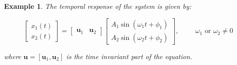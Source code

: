 \documentclass[12pt,letter]{article}
\newtheorem{ex}{Example}
\numberwithin{ex}{section} %
\newenvironment{example}{\begin{mdframed}[middlelinewidth=0.5mm]\begin{ex}\normalfont}{\end{ex}\end{mdframed}}
\numberwithin{re}{section} %
\begin{document}
\begin{example}
\pagebreak


The temporal response of the system is given by:

\begin{equation}
\begin{bmatrix} x_1(t) \\  x_2(t) \end{bmatrix} =  \begin{bmatrix} \mathbf{u}_1 & \mathbf{u}_2 \end{bmatrix}
\begin{bmatrix} A_1 \sin (\omega_1 t + \phi_1 )\\ A_2 \sin (\omega_2 t + \phi_2 )\end{bmatrix}, \hspace{1cm} \omega_1 \text{ or } \omega_2 \neq 0
\end{equation}

where $\mathbf{u} = [\mathbf{u}_1, \mathbf{u}_2]$ is the time invariant part of the equation. 


\end{example}
		

		
		
		
\end{document}
